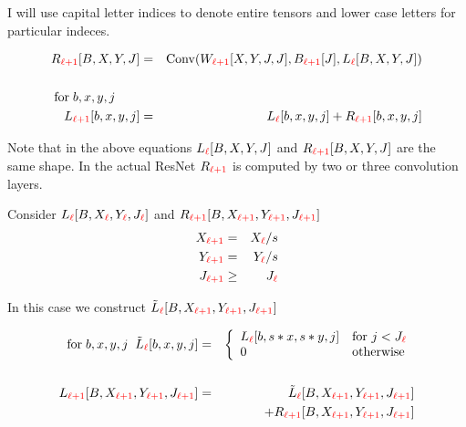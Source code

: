 {\vfill I will use capital letter indices to denote entire tensors and lower case letters for particular indeces.


\medskip
\begin{eqnarray*}
R_{\color{red} \ell+1}[B,X,Y,J] & = & \mathrm{Conv}(W_{\color{red} \ell+1}[X,Y,J,J],B_{\color{red} \ell+1}[J],L_{\color{red} \ell}[B,X,Y,J]) \\
\\
\mathrm{for}\;b,x,y,j\;\;\;\;\;\;\;\\
L_{\color{red} \ell+1}[b,x,y,j] & = & L_{\color{red}\ell}[b,x,y,j] + R_{\color{red} \ell+1}[b,x,y,j]
\end{eqnarray*}

\vfill Note that in the above equations $L_{\color{red} \ell}[B,X,Y,J]$ and $R_{\color{red} \ell+1}[B,X,Y,J]$ are the same shape.
\vfill
In the actual ResNet $R_{\color{red} \ell+1}$ is computed by two or three convolution layers.


Consider $L_{\color{red} \ell}[B,X_{\color{red} \ell},Y_{\color{red} \ell},J_{\color{red} \ell}]$ and $R_{\color{red} \ell+1}[B,X_{\color{red} \ell+1},Y_{\color{red} \ell+1},J_{\color{red} \ell+1}]$
\begin{eqnarray*}
X_{\color{red} \ell+1} & = & X_{\color{red} \ell}/s \\
Y_{\color{red} \ell+1} & = & Y_{\color{red} \ell}/s \\
J_{\color{red} \ell+1} & \geq &  J_{\color{red} \ell}
\end{eqnarray*}


\vfill
In this case we construct $\tilde{L}_{\color{red} \ell}[B,X_{\color{red} \ell +1},Y_{\color{red} \ell+1},J_{\color{red}\ell +1}]$

\begin{eqnarray*}
\mathrm{for}\;b,x,y,j\;\;\tilde{L}_{\color{red} \ell}[b,x,y,j] & = & \left\{\begin{array}{ll} L_{\color{red} \ell}[b,s*x,s*y,j] & \mbox{for $j < J_{\color{red} \ell}$} \\ 0 & \mbox{otherwise} \end{array}\right.\\
\\
L_{\color{red} \ell+1}[B,X_{\color{red} \ell +1},Y_{\color{red} \ell+1},J_{\color{red}\ell +1}] & = & \tilde{L}_{\color{red} \ell}[B,X_{\color{red} \ell +1},Y_{\color{red} \ell+1},J_{\color{red}\ell +1}] \\
& & + R_{\color{red} \ell+1}[B,X_{\color{red} \ell +1},Y_{\color{red} \ell+1},J_{\color{red}\ell +1}]
\end{eqnarray*}

}
